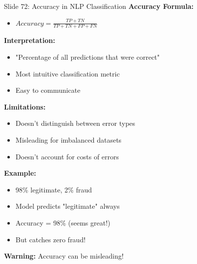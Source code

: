 \documentclass[8pt]{beamer}
\begin{document}
	\begin{frame}{Slide 72: Accuracy in NLP Classification}
		\fontsize{6.5}{7.5}\selectfont
		\textbf{Accuracy Formula:}
		\begin{itemize}
			\item $Accuracy = \frac{TP + TN}{TP + TN + FP + FN}$
		\end{itemize}
		
		\vspace{0.1cm}
		\textbf{Interpretation:}
		\begin{itemize}
			\item "Percentage of all predictions that were correct"
			\item Most intuitive classification metric
			\item Easy to communicate
		\end{itemize}
		
		\vspace{0.1cm}
		\textbf{Limitations:}
		\begin{itemize}
			\item Doesn't distinguish between error types
			\item Misleading for imbalanced datasets
			\item Doesn't account for costs of errors
		\end{itemize}
		
		\vspace{0.1cm}
		\textbf{Example:}
		\begin{itemize}
			\item 98\% legitimate, 2\% fraud
			\item Model predicts "legitimate" always
			\item Accuracy = 98\% (seems great!)
			\item But catches zero fraud!
		\end{itemize}
		
		\textcolor{myblue}{\textbf{Warning:}} Accuracy can be misleading!
	\end{frame}
	
\end{document}
